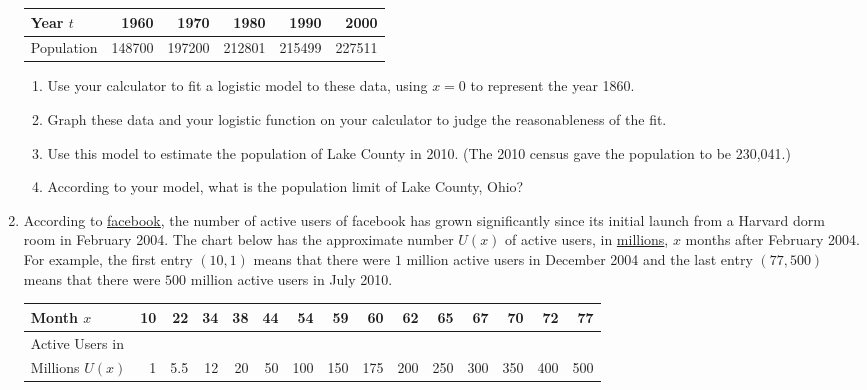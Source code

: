 \begin{enumerate}
\noindent \begin{tabular}{|l|r|r|r|r|r|} \hline
Year $t$ & 1960 & 1970 & 1980 & 1990 & 2000 \\ \hline 
Population& 148700 & 197200 & 212801 & 215499 & 227511 \\ \hline
\end{tabular}

\normalsize

\begin{enumerate}

\item  Use your calculator to fit a logistic model to these data, using $x = 0$ to represent the year 1860. 

\item  Graph these data and your logistic function on your calculator to judge the reasonableness of the fit.

\item  Use this model to estimate the population of Lake County in 2010.  (The 2010 census gave the population to be 230,041.)

\item  According to your model, what is the population limit of Lake County, Ohio?

\end{enumerate}



\item According to \href{http://www.facebook.com/press/info.php?timeline}{\underline{facebook}}, the number of active users of facebook has grown significantly since its initial launch from a Harvard dorm room in February 2004. The chart below has the approximate number $U(x)$ of active users, in \underline{millions}, $x$ months after February 2004.  For example, the first entry $(10, 1)$ means that there were $1$ million active users in December 2004 and the last entry $(77, 500)$ means that there were $500$ million active users in July 2010.

\medskip
\small
\noindent \begin{tabular}{|l|r|r|r|r|r|r|r|r|r|r|r|r|r|r|} \hline
Month $x$ & 10 & 22 & 34 & 38 & 44 & 54 & 59 & 60 & 62 & 65 & 67 & 70 & 72 & 77 \\ \hline 
Active Users in & & & & & & & & & & & & & & \\
Millions $U(x)$ & 1 & 5.5 & 12 & 20 & 50 & 100 & 150 & 175 & 200 & 250 & 300 & 350 & 400 & 500\\ \hline
\end{tabular}
\normalsize
\medskip


\end{enumerate}
